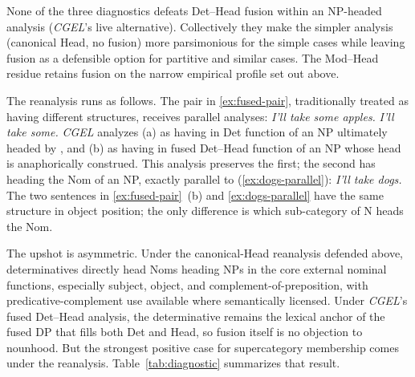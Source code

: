 \documentclass[12pt]{article}
\begin{document}
None of the three diagnostics defeats Det--Head fusion within an NP-headed analysis (\textit{CGEL}'s live alternative). Collectively they make the simpler analysis (canonical Head, no fusion) more parsimonious for the simple cases while leaving fusion as a defensible option for partitive and similar cases. The Mod--Head residue retains fusion on the narrow empirical profile set out above.

The reanalysis runs as follows. The pair in \ref{ex:fused-pair}, traditionally treated as having different structures, receives parallel analyses:
\ea\label{ex:fused-pair}
\ea \textit{I'll take some apples.}
\ex \textit{I'll take some.}
\z
\z
\textit{CGEL} analyzes (a) as having  in Det function of an NP ultimately headed by , and (b) as having  in fused Det--Head function of an NP whose head is anaphorically construed. This analysis preserves the first; the second has  heading the Nom of an NP, exactly parallel to (\ref{ex:dogs-parallel}):
\ea\label{ex:dogs-parallel}
\textit{I'll take dogs.}
\z
The two sentences in \ref{ex:fused-pair}~(b) and \ref{ex:dogs-parallel} have the same structure in object position; the only difference is which sub-category of N heads the Nom.

The upshot is asymmetric. Under the canonical-Head reanalysis defended above, determinatives directly head Noms heading NPs in the core external nominal functions, especially subject, object, and complement-of-preposition, with predicative-complement use available where semantically licensed. Under \textit{CGEL}'s fused Det--Head analysis, the determinative remains the lexical anchor of the fused DP that fills both Det and Head, so fusion itself is no objection to nounhood. But the strongest positive case for supercategory membership comes under the reanalysis. Table~\ref{tab:diagnostic} summarizes that result.
\end{document}
